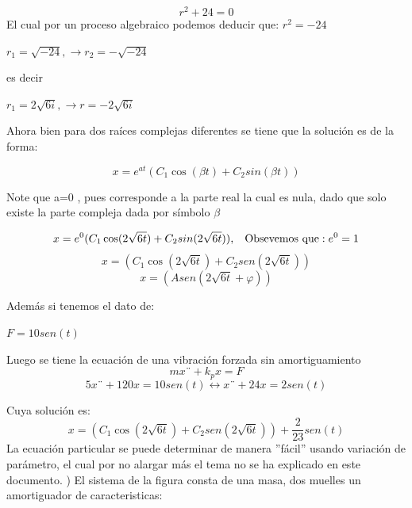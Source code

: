 \documentclass[oneside,12pt]{report}
\begin{document}
$$r^{2}+24=0$$
El cual por un proceso algebraico podemos deducir que:
$r^{2}=-24$

\begin{center}
	$r_1=\sqrt{-24}, \longrightarrow r_2=-\sqrt{-24}$
\end{center}
es decir
\begin{center}
	$r_1=2\sqrt{6i}, \longrightarrow r=-2\sqrt{6i}$
\end{center}

Ahora bien para dos  raíces complejas diferentes se tiene que  la solución es de la forma:

\begin{equation}
	x=e^{at}(C_1\cos(\beta t)+C_2 sin(\beta t))
\end{equation}

Note que   a=0 , pues corresponde a la parte real la cual es nula, dado que solo existe la parte compleja  dada por símbolo $ \beta$

\begin{equation}
	x=e^{0}(C_1 \cos(2\sqrt{6t})+ C_2 sin(2\sqrt{6t})) ,\hspace{0.3cm} \text{Obsevemos que}: e^{0}=1
\end{equation}
		\begin{equation}
x=(C_1 \cos(2\sqrt{6t})+ C_2 sen(2\sqrt{6t}))
					\end{equation}
\begin{equation}
	x=(Asen(2\sqrt{6t}+\varphi))
\end{equation}

Además si tenemos el dato de:

$F=10 sen(t)$

Luego se tiene la ecuación de una vibración forzada sin amortiguamiento 
\begin{equation}
	mx¨+k_px=F
\end{equation}
\begin{equation}
	5x¨+120x=10 sen(t)\leftrightarrow x¨+24x=2sen(t)
\end{equation}

Cuya solución es: 
\begin{equation}
	x=(C_1 \cos(2\sqrt{6t})+C_2 sen(2\sqrt{6t}))+\frac{2}{23} sen(t)
\end{equation}
La ecuación particular se puede determinar de manera ''fácil''  usando variación de parámetro, el cual por no alargar más el tema no se ha explicado en este documento.
) El sistema de la figura consta de una masa, dos muelles  un amortiguador de caracteristicas:
\end{document}
